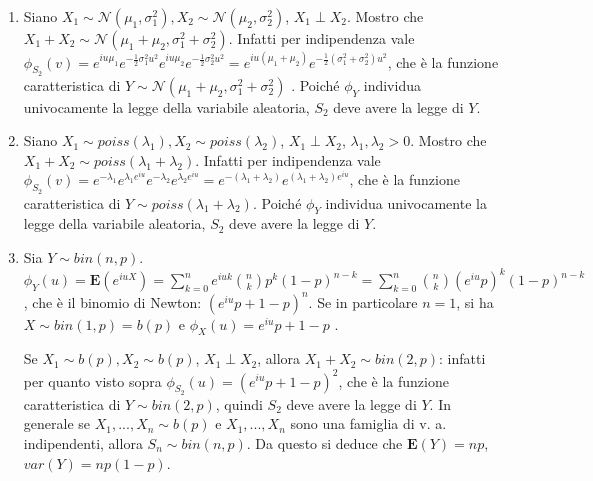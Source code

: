 \documentclass{article}
\begin{document}
\begin{enumerate}
\item Siano $X_{1}\sim \mathcal{N}\left( \mu _{1},\sigma _{1}^{2}\right)
,X_{2}\sim \mathcal{N}\left( \mu _{2},\sigma _{2}^{2}\right) $, $X_{1}\perp
X_{2}$. Mostro che $X_{1}+X_{2}\sim \mathcal{N}\left( \mu _{1}+\mu
_{2},\sigma _{1}^{2}+\sigma _{2}^{2}\right) $. Infatti per indipendenza vale 
$\phi _{S_{2}}\left( v\right) =e^{iu\mu _{1}}e^{-\frac{1}{2}\sigma
_{1}^{2}u^{2}}e^{iu\mu _{2}}e^{-\frac{1}{2}\sigma _{2}^{2}u^{2}}=e^{iu\left(
\mu _{1}+\mu _{2}\right) }e^{-\frac{1}{2}\left( \sigma _{1}^{2}+\sigma
_{2}^{2}\right) u^{2}}$, che \`{e} la funzione caratteristica di $Y\sim 
\mathcal{N}\left( \mu _{1}+\mu _{2},\sigma _{1}^{2}+\sigma _{2}^{2}\right) $%
. Poich\'{e} $\phi _{Y}$ individua univocamente la legge della variabile
aleatoria, $S_{2}$ deve avere la legge di $Y$.

\item Siano $X_{1}\sim poiss\left( \lambda _{1}\right) ,X_{2}\sim
poiss\left( \lambda _{2}\right) $, $X_{1}\perp X_{2}$, $\lambda _{1},\lambda
_{2}>0$. Mostro che $X_{1}+X_{2}\sim poiss\left( \lambda _{1}+\lambda
_{2}\right) $. Infatti per indipendenza vale $\phi _{S_{2}}\left( v\right)
=e^{-\lambda _{1}}e^{\lambda _{1}e^{iu}}e^{-\lambda _{2}}e^{\lambda
_{2}e^{iu}}=e^{-\left( \lambda _{1}+\lambda _{2}\right) }e^{\left( \lambda
_{1}+\lambda _{2}\right) e^{iu}}$, che \`{e} la funzione caratteristica di $%
Y\sim poiss\left( \lambda _{1}+\lambda _{2}\right) $. Poich\'{e} $\phi _{Y}$
individua univocamente la legge della variabile aleatoria, $S_{2}$ deve
avere la legge di $Y$.

\item Sia $Y\sim bin\left( n,p\right) $. $\phi _{Y}\left( u\right) =\mathbf{E%
}\left( e^{iuX}\right) =\sum_{k=0}^{n}e^{iuk}\binom{n}{k}p^{k}\left(
1-p\right) ^{n-k}=\sum_{k=0}^{n}\binom{n}{k}\left( e^{iu}p\right) ^{k}\left(
1-p\right) ^{n-k}$, che \`{e} il binomio di Newton: $\left(
e^{iu}p+1-p\right) ^{n}$. Se in particolare $n=1$, si ha $X\sim bin\left(
1,p\right) =b\left( p\right) $ e $\phi _{X}\left( u\right) =e^{iu}p+1-p$%
.\qquad

Se $X_{1}\sim b\left( p\right) ,X_{2}\sim b\left( p\right) $, $X_{1}\perp
X_{2}$, allora $X_{1}+X_{2}\sim bin\left( 2,p\right) $: infatti per quanto
visto sopra $\phi _{S_{2}}\left( u\right) =\left( e^{iu}p+1-p\right) ^{2}$,
che \`{e} la funzione caratteristica di $Y\sim bin\left( 2,p\right) $,
quindi $S_{2}$ deve avere la legge di $Y$. In generale se $%
X_{1},...,X_{n}\sim b\left( p\right) $ e $X_{1},...,X_{n}$ sono una famiglia
di v. a. indipendenti, allora $S_{n}\sim bin\left( n,p\right) $. Da questo
si deduce che $\mathbf{E}\left( Y\right) =np$, $var\left( Y\right) =np\left(
1-p\right) $.


\end{enumerate}
\end{document}
